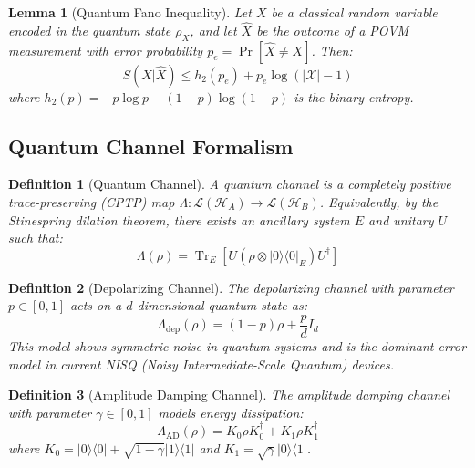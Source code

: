 \documentclass{ieeeaccess}
\newtheorem{lemma}{Lemma}[section]
\newtheorem{definition}{Definition}[section]
\begin{document}
\begin{lemma}[Quantum Fano Inequality]
Let $X$ be a classical random variable encoded in the quantum state $\rho_X$, and let $\hat{X}$ be the outcome of a POVM measurement with error probability $p_e = \Pr[\hat{X} \neq X]$. Then:
\begin{equation}
    S(X|\hat{X}) \leq h_2(p_e) + p_e \log(|\mathcal{X}| - 1)
\end{equation}
where $h_2(p) = -p\log p - (1-p)\log(1-p)$ is the binary entropy.
\end{lemma}

\subsection{Quantum Channel Formalism}

\begin{definition}[Quantum Channel]
A quantum channel is a completely positive trace-preserving (CPTP) map $\Lambda: \mathcal{L}(\mathcal{H}_A) \to \mathcal{L}(\mathcal{H}_B)$. Equivalently, by the Stinespring dilation theorem, there exists an ancillary system $E$ and unitary $U$ such that:
\begin{equation}
    \Lambda(\rho) = \operatorname{Tr}_E\left[U (\rho \otimes |0\rangle\langle 0|_E) U^\dagger\right]
\end{equation}
\end{definition}

\begin{definition}[Depolarizing Channel]
The depolarizing channel with parameter $p \in [0, 1]$ acts on a $d$-dimensional quantum state as:
\begin{equation}
    \Lambda_{\text{dep}}(\rho) = (1-p)\rho + \frac{p}{d} I_d
\end{equation}
This model shows symmetric noise in quantum systems and is the dominant error model in current NISQ (Noisy Intermediate-Scale Quantum) devices.
\end{definition}

\begin{definition}[Amplitude Damping Channel]
The amplitude damping channel with parameter $\gamma \in [0, 1]$ models energy dissipation:
\begin{equation}
    \Lambda_{\text{AD}}(\rho) = K_0 \rho K_0^\dagger + K_1 \rho K_1^\dagger
\end{equation}
where $K_0 = |0\rangle\langle 0| + \sqrt{1-\gamma}|1\rangle\langle 1|$ and $K_1 = \sqrt{\gamma}|0\rangle\langle 1|$.
\end{definition}
\end{document}
